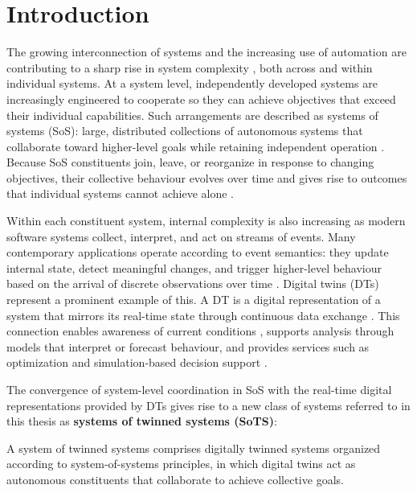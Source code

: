 \chapter{Introduction}\label{ch:introduction}
The growing interconnection of systems and the increasing use of automation are contributing to a sharp rise in system complexity \cite{incose2035}, both across and within individual systems. At a system level, independently developed systems are increasingly engineered to cooperate so they can achieve objectives that exceed their individual capabilities. Such arrangements are described as systems of systems (SoS): large, distributed collections of autonomous systems that collaborate toward higher-level goals while retaining independent operation \cite{maier1998architecting}. Because SoS constituents join, leave, or reorganize in response to changing objectives, their collective behaviour evolves over time and gives rise to outcomes that individual systems cannot achieve alone \cite{nielsen2015systems}.

Within each constituent system, internal complexity is also increasing as modern software systems collect, interpret, and act on streams of events. Many contemporary applications operate according to event semantics: they update internal state, detect meaningful changes, and trigger higher-level behaviour based on the arrival of discrete observations over time \cite{cugola2012processing}. Digital twins (DTs) represent a prominent example of this. A DT is a digital representation of a system that mirrors its real-time state through continuous data exchange \cite{kritzinger2018digital}. This connection enables awareness of current conditions \cite{pires2019digital,zhang2024digital}, supports analysis through models that interpret or forecast behaviour, and provides services such as optimization and simulation-based decision support \cite{leng2021digital}.

The convergence of system-level coordination in SoS with the real-time digital representations provided by DTs gives rise to a new class of systems referred to in this thesis as \textbf{systems of twinned systems (SoTS)}:

\begin{definitionframe}
A system of twinned systems comprises digitally twinned systems organized according to system-of-systems principles, in which digital twins act as autonomous constituents that collaborate to achieve collective goals.
\end{definitionframe}

